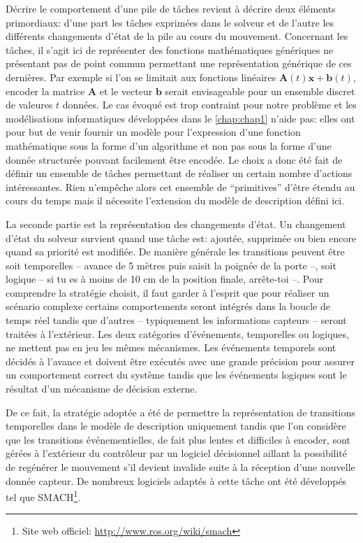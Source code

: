 Décrire le comportement d'une pile de tâches
revient à décrire deux éléments primordiaux: d'une part les tâches
exprimées dans le solveur et de l'autre les différents changements
d'état de la pile au cours du mouvement. Concernant les
tâches, il s'agit ici de représenter des fonctions
mathématiques génériques ne présentant pas de point commun permettant
une représentation générique de ces dernières. Par exemple si l'on se
limitait aux fonctions linéaires $\mathbf{A}(t) \mathbf{x} +
\mathbf{b}(t)$, encoder la matrice $\mathbf{A}$ et le vecteur
$\mathbf{b}$ serait envisageable pour un ensemble discret de valeures
$t$ données. Le cas évoqué est trop contraint pour notre problème et
les modélisations informatiques développées dans le
\autoref{chap:chap1} n'aide pas: elles ont pour but de venir fournir
un modèle pour l'expression d'une fonction mathématique sous la forme
d'un algorithme et non pas sous la forme d'une donnée structurée
pouvant facilement être encodée. Le choix a donc été fait de définir
un ensemble de tâches permettant de réaliser un certain nombre
d'actions intéressantes. Rien n'empêche alors cet ensemble de
``primitives'' d'être étendu au cours du temps mais il nécessite
l'extension du modèle de description défini ici.


La seconde partie est la représentation des changements d'état. Un
changement d'état du solveur survient quand une tâche est: ajoutée,
supprimée ou bien encore quand sa priorité est modifiée. De manière
générale les transitions peuvent être soit temporelles -- avance de 5
mètres puis saisit la poignée de la porte --, soit logique -- si tu es
à moins de 10 cm de la position finale, arrête-toi --. Pour
comprendre la stratégie choisit, il faut garder à l'esprit que pour
réaliser un scénario complexe certains comportements seront intégrés
dans la boucle de temps réel tandis que d'autres -- typiquement les
informations capteurs -- seront traitées à l'extérieur. Les deux
catégories d'événements, temporelles ou logiques, ne mettent pas en
jeu les mêmes mécanismes. Les événements temporels sont décidés à
l'avance et doivent être exécutés avec une grande précision pour
assurer un comportement correct du système tandis que les événements
logiques sont le résultat d'un mécanisme de décision externe.

De ce fait, la stratégie adoptée a été de permettre la représentation
de transitions temporelles dans le modèle de description uniquement
tandis que l'on considère que les transitions événementielles, de fait
plus lentes et difficiles à encoder, sont gérées à l'extérieur du
contrôleur par un logiciel décisionnel aillant la possibilité de
regénérer le mouvement s'il devient invalide suite à la réception
d'une nouvelle donnée capteur. De nombreux logiciels adaptés à cette
tâche ont été développés tel que SMACH\footnote{Site web officiel:
  \url{http://www.ros.org/wiki/smach}}.


